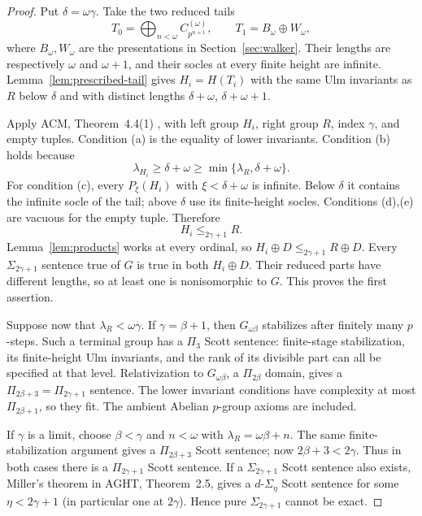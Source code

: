 \documentclass[11pt]{article}
\begin{document}
\begin{proof}
Put $\delta=\omega\gamma$. Take the two reduced tails
\[
 T_0=\bigoplus_{n<\omega}C_{p^{n+1}}^{(\omega)},
 \qquad T_1=B_\omega\oplus W_\omega,
\]
where $B_\omega,W_\omega$ are the presentations in Section~\ref{sec:walker}.
Their lengths are respectively $\omega$ and $\omega+1$, and their
socles at every finite height are infinite. Lemma~\ref{lem:prescribed-tail}
gives $H_i=H(T_i)$ with the same Ulm invariants as $R$ below $\delta$
and with distinct lengths $\delta+\omega$, $\delta+\omega+1$.

Apply ACM, Theorem~4.4(1) \cite{ACM}, with left group $H_i$, right group $R$,
index $\gamma$, and empty tuples. Condition (a) is the equality of
lower invariants. Condition (b) holds because
\[
 \lambda_{H_i}\ge\delta+\omega
 \ge\min\{\lambda_R,\delta+\omega\}.
\]
For condition (c), every $P_\xi(H_i)$ with $\xi<\delta+\omega$ is
infinite. Below $\delta$ it contains the infinite socle of the tail;
above $\delta$ use its finite-height socles. Conditions (d),(e) are
vacuous for the empty tuple. Therefore
\[
 H_i\le_{2\gamma+1}R.
\]
Lemma~\ref{lem:products} works at
every ordinal, so $H_i\oplus D\le_{2\gamma+1}R\oplus D$.
Every $\Sigma_{2\gamma+1}$ sentence true of $G$ is true in both
$H_i\oplus D$. Their reduced parts have different lengths, so at
least one is nonisomorphic to $G$. This proves the first assertion.

Suppose now that $\lambda_R<\omega\gamma$. If $\gamma=\beta+1$,
then $G_{\omega\beta}$ stabilizes after finitely many $p$-steps.
Such a terminal group has a $\Pi_3$ Scott sentence: finite-stage
stabilization, its finite-height Ulm invariants, and the rank of its
divisible part can all be specified at that level. Relativization to
$G_{\omega\beta}$, a $\Pi_{2\beta}$ domain, gives a
$\Pi_{2\beta+3}=\Pi_{2\gamma+1}$ sentence. The lower invariant
conditions have complexity at most $\Pi_{2\beta+1}$, so they fit.
The ambient Abelian $p$-group axioms are included.

If $\gamma$ is a limit, choose $\beta<\gamma$ and $n<\omega$ with
$\lambda_R=\omega\beta+n$. The same finite-stabilization argument
gives a $\Pi_{2\beta+3}$ Scott sentence; now
$2\beta+3<2\gamma$. Thus in both cases there is a
$\Pi_{2\gamma+1}$ Scott sentence. If a
$\Sigma_{2\gamma+1}$ Scott sentence also exists, Miller's theorem
in AGHT, Theorem~2.5, gives a $d\text{-}\Sigma_\eta$ Scott sentence
for some $\eta<2\gamma+1$ (in particular one at $2\gamma$).
Hence pure $\Sigma_{2\gamma+1}$ cannot be exact.
\end{proof}
\end{document}
